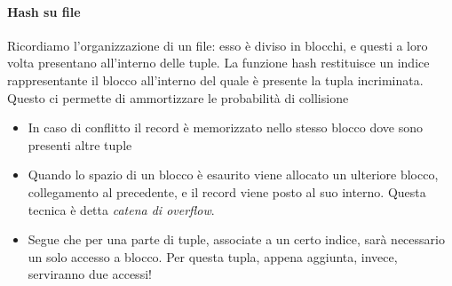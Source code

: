 \paragraph{Hash su file} Ricordiamo l'organizzazione di un file: esso è diviso in blocchi, e questi a loro volta presentano all'interno delle tuple. La funzione hash restituisce un indice rappresentante il blocco all'interno del quale è presente la tupla incriminata. Questo ci permette di ammortizzare le probabilità di collisione
\begin{itemize}
	\item In caso di conflitto il record è memorizzato nello stesso blocco dove sono presenti altre tuple
	\item Quando lo spazio di un blocco è esaurito viene allocato un ulteriore blocco, collegamento al precedente, e il record viene posto al suo interno. Questa tecnica è detta \emph{catena di overflow}.
	\item Segue che per una parte di tuple, associate a un certo indice, sarà necessario un solo accesso a blocco. Per questa tupla, appena aggiunta, invece, serviranno due accessi!
\end{itemize}
